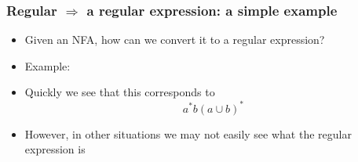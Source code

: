 \begin{frame}[allowframebreaks] \frametitle{Regular $\Rightarrow$  a regular
    expression: a simple example}
  \begin{itemize} 
  \item Given an NFA, how can we convert it to a
    regular expression?
\item Example:

  \begin{center}
  \end{center}
  
\item Quickly we see that this corresponds to
  \begin{equation*}
  a^*b(a\cup b)^*
\end{equation*}
\item However, in other situations we may not
  easily see what the regular
  expression is
\end{itemize}\end{frame}


